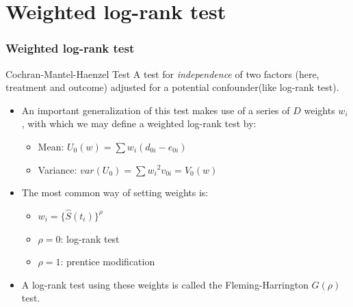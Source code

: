 \documentclass{beamer}
\newcommand{\empr}[1]{{\emph{\color{red}#1}}}
\begin{document}
\section{Weighted log-rank test}
\begin{frame}
\frametitle{Weighted log-rank test}
\begin{defblock}{Cochran-Mantel-Haenzel Test}
A test for \empr{independence} of two factors (here, treatment and outcome) adjusted for a potential confounder(like log-rank test). 
\end{defblock}
\begin{itemize}
\item An important generalization of this test makes use of a series of $D$ {\color{red}weights $w_i$}, with which we may define a weighted log-rank test by:
\begin{itemize}
\item Mean: $U_0(w) = \sum w_i(d_{0i} - e_{0i})$
\item Variance: $var(U_0) = \sum {w_i}^2v_{0i} = V_0(w)$
\end{itemize}
\item The most common way of setting weights is:
\begin{itemize}
\item $w_i = \lbrace \hat{S}(t_i)\rbrace^{\rho}$
\item $\rho = 0$: log-rank test
\item $\rho = 1$: prentice modification
\end{itemize}
\item A log-rank test using these weights is called the {\color{red}Fleming-Harrington $G(\rho)$ test}.
\end{itemize}
\end{frame}
\end{document}
